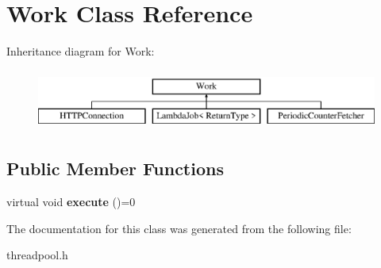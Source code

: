 \section{Work Class Reference}
\label{classWork}
Inheritance diagram for Work\+:\begin{figure}[H]
\begin{center}
\leavevmode
\includegraphics[height=2.000000cm]{classWork}
\end{center}
\end{figure}
\subsection*{Public Member Functions}
\begin{DoxyCompactItemize}
\item 
\mbox{\label{classWork_a7963fd4450ae9ac65ec4f5b02e7931d2}} 
virtual void {\bfseries execute} ()=0
\end{DoxyCompactItemize}


The documentation for this class was generated from the following file\+:\begin{DoxyCompactItemize}
\item 
threadpool.\+h\end{DoxyCompactItemize}
